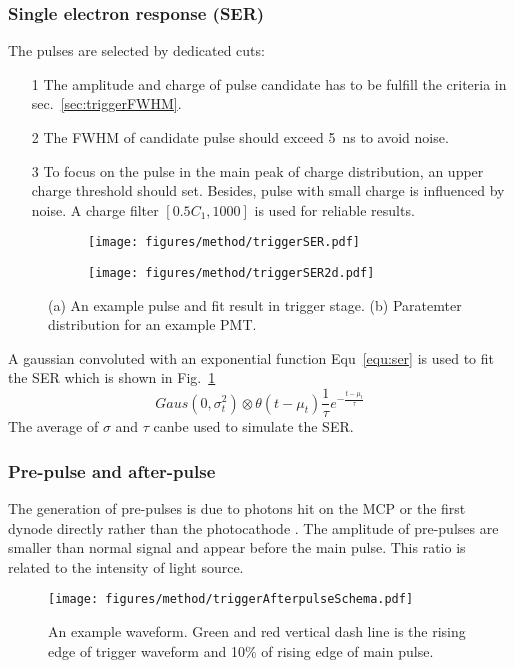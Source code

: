 \subsubsection{Single electron response (SER)}
The pulses are selected by dedicated cuts:
\begin{itemize}
    \item[1] The amplitude and charge of pulse candidate has to be fulfill the criteria in sec.~\ref{sec:triggerFWHM}.
    \item[2] The FWHM of candidate pulse should exceed \SI{5}{ns} to avoid noise.
    \item[3] To focus on the pulse in the main peak of charge distribution, an upper charge threshold should set. Besides, pulse with small charge is influenced by noise. A charge filter $[0.5C_1, 1000]$ is used for reliable results.
\end{itemize}

\begin{figure}
    \centering
    \begin{subfigure}[t]{0.47\textwidth}
        \texttt{[image: figures/method/triggerSER.pdf]}
        \caption{}
        \label{fig:triggerser}
    \end{subfigure}
    \begin{subfigure}[t]{0.47\textwidth}
        \texttt{[image: figures/method/triggerSER2d.pdf]}
        \caption{}
        \label{fig:triggerser2d}
    \end{subfigure}
    \caption{(a) An example pulse and fit result in trigger stage. (b) Paratemter distribution for an example PMT.}
\end{figure}

A gaussian convoluted with an exponential function Equ~\eqref{equ:ser} is used to fit the SER which is shown in Fig.~\ref{fig:triggerser}
\begin{equation}
    \label{equ:ser}
    Gaus(0,\sigma_t^2)\otimes\theta(t-\mu_t)\frac{1}{\tau}e^{-\frac{t-\mu_t}{\tau}}
\end{equation}
The average of $\sigma$ and $\tau$ canbe used to simulate the SER. 
\subsubsection{Pre-pulse and after-pulse}
The generation of pre-pulses is due to photons hit on the MCP or the first dynode directly rather than the photocathode \cite{JUNOMassTesting}. The amplitude of pre-pulses are smaller than normal signal and appear before the main pulse. This ratio is related to the intensity of light source.
\begin{figure*}
    \centering
    \texttt{[image: figures/method/triggerAfterpulseSchema.pdf]}
    \caption{An example waveform. Green and red vertical dash line is the rising edge of trigger waveform and 10\% of rising edge of main pulse.}
    \label{fig:afterpulseSchema}
\end{figure*}

